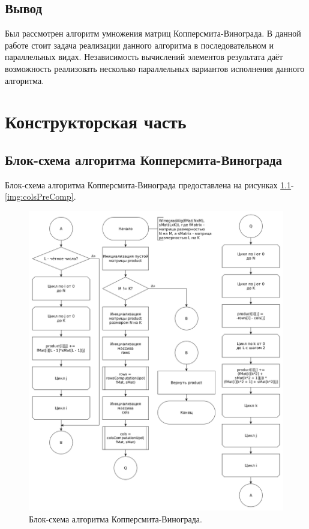 \documentclass[12pt]{report}
\begin{document}
\section*{Вывод}
Был рассмотрен алгоритм умножения матриц Копперсмита-Винограда. В данной работе стоит задача реализации данного алгоритма в последовательном и параллельных видах. Независимость вычислений элементов результата даёт возможность реализовать несколько параллельных вариантов исполнения данного алгоритма.

\chapter{Конструкторская часть}
\section{Блок-схема алгоритма Копперсмита-Винограда}
Блок-схема алгоритма Копперсмита-Винограда предоставлена на рисунках \ref{img:winodradScheme}-\ref{img:colsPreComp}.

\begin{figure}
\begin{center}
\includegraphics[scale=0.4]{inc/img/winogradScheme.png}
\captionsetup{justification=centering}
	\caption{Блок-схема алгоритма Копперсмита-Винограда.}
	\label{img:winodradScheme}	
\end{center}
\end{figure}
\end{document}
